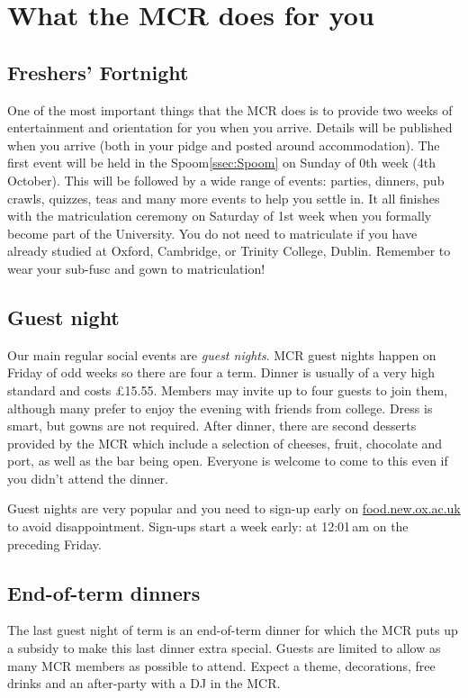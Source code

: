 
\chapter{What the MCR does for you}

\section{Freshers' Fortnight}
One of the most important things that the MCR does is to provide two weeks of
entertainment and orientation for you when you arrive. Details will be published
when you arrive (both in your pidge and posted around accommodation). The first
event will be held in the Spoom\ref{ssec:Spoom} on Sunday of 0th week (4th
October).
This will be followed by a wide range of events: parties, dinners, pub crawls, quizzes, teas and many more events to help you settle in. It all finishes with the matriculation ceremony on Saturday of 1st week when you formally become part of the University. You do not need to matriculate if you have already studied at Oxford, Cambridge, or Trinity College, Dublin. Remember to wear your sub-fusc and gown to matriculation!

\section{Guest night}
Our main regular social events are \emph{guest nights}. MCR guest nights happen
on Friday of odd weeks so there are four a term. Dinner is usually of a very
high standard and costs \pounds15.55. Members may invite up to four guests to
join them, although many prefer to enjoy the evening with friends from college. Dress is smart, but gowns are not required. After dinner, there are second desserts provided by the MCR which include a selection of cheeses, fruit, chocolate and port, as well as the bar being open. Everyone is welcome to come to this even if you didn't attend the dinner.

Guest nights are very popular and you need to sign-up early on
\url{food.new.ox.ac.uk} to avoid disappointment. Sign-ups start a week early: at
12:01\,am on the preceding Friday.

\section{End-of-term dinners}
The last guest night of term is an end-of-term dinner for which the MCR puts up
a subsidy to make this last dinner extra special. Guests are limited to allow as
many MCR members as possible to attend. Expect a theme, decorations, free drinks and an after-party with a DJ in the MCR.
\enlargethispage{\baselineskip} %

